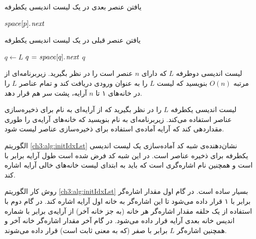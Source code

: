 \begin{algorithm}
\caption{یافتن عنصر بعدی در یک لیست اندیسی یکطرفه}\label{ch3:alg:nxtIdxLst}
\begin{latin}
\begin{algorithmic}[1]
    \State    \Return    $space[p].\hspace*{1pt}\mathit{next}$
\EndFunction
\end{algorithmic}
\end{latin}
\end{algorithm}

\begin{algorithm}
\caption{یافتن عنصر قبلی در یک لیست اندیسی یکطرفه}\label{ch3:alg:prevIdxLst}
\begin{latin}
\begin{algorithmic}[1]
        \State    $q \gets L$
            \State    $q \mathrel{\hspace{1pt}=\hspace{1pt}} space[q].\hspace*{1pt}\mathit{next}$
        \EndWhile
        \State    \Return    $q$
    \Else
        \State    \Return    {}
    \EndIf
\EndFunction
\end{algorithmic}
\end{latin}
\end{algorithm}

 لیست اندیسی دوطرفه {$L$} که دارای {$n$} عنصر است را در نظر بگیرید. زیربرنامه‌ای از مرتبه {$O(n)$} بنویسید که لیست {$L$} را به عنوان ورودی دریافت کند و تمام عناصر {$L$} را در خانه‌های ۱ تا {$n$} آرایه، پشت سر هم قرار دهد.


 لیست اندیسی یکطرفه {$L$} را در نظر بگیرید که از آرایه‌ای به نام {} برای ذخیره‌سازی عناصر استفاده می‌کند. زیربرنامه‌ای به نام {} بنویسید که خانه‌های آرایه‌ی {} را طوری مقداردهی کند که آرایه آماده‌ی استفاده برای ذخیره‌سازی عناصر لیست شود.


الگوریتم {\eqref{ch3:alg:initIdxLst}} نشان‌دهنده‌ی شبه کد آماده‌سازی یک لیست اندیسی یکطرفه برای ذخیره عناصر است. در این شبه کد فرض شده است طول آرایه {} برابر با {} است و همچنین {} نام اشاره‌گری است که باید به ابتدای لیست خانه‌های خالی آرایه اشاره کند.

روش کار الگوریتم {\eqref{ch3:alg:initIdxLst}} بسیار ساده است. در گام اول مقدار اشاره‌گر {} برابر با ۱ قرار داده می‌شود تا این اشاره‌گر به خانه اول آرایه اشاره کند. در گام دوم با استفاده از یک حلقه مقدار اشاره‌گر {} هر خانه (به جز خانه آخر) از آرایه‌ی {} برابر با شماره اندیس خانه بعدی آرایه قرار داده می‌شود. در گام آخر مقدار اشاره‌گر {} خانه آخر و همچنین اشاره‌گر {$L$} برابر با صفر (که به معنی ثابت {} است) قرار داده می‌شوند.

